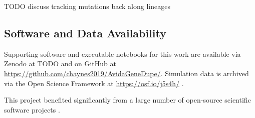 TODO discuss tracking mutations back along lineages

\subsection{Software and Data Availability} \label{sec:materials}

Supporting software and executable notebooks for this work are available via Zenodo at TODO \citep{TODO} and on GitHub at \url{https://github.com/chaynes2019/AvidaGeneDupe/}.
Simulation data is archived via the Open Science Framework at \url{https://osf.io/j5s4h/} \citep{foster2017open}.

This project benefited significantly from a large number of open-source scientific software projects \citep{2020SciPy-NMeth,harris2020array,reback2020pandas,mckinney-proc-scipy-2010,waskom2021seaborn,hunter2007matplotlib,moreno2023teeplot,r_core_team_r:_2015}.
